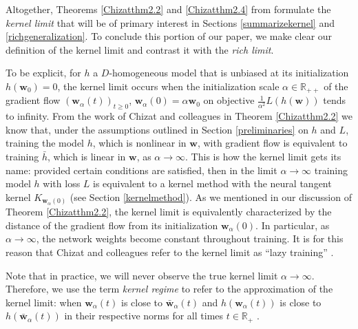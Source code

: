\documentclass{article}
\begin{document}
Altogether, Theorems \ref{Chizatthm2.2} and \ref{Chizatthm2.4} from \cite{chizat2019lazy} formulate the \textit{kernel limit} that will be of primary interest in Sections \ref{summarizekernel} and \ref{richgeneralization}. To conclude this portion of our paper, we make clear our definition of the kernel limit and contrast it with the \textit{rich limit}. 

To be explicit, for $h$ a $D$-homogeneous model that is unbiased at its initialization $h(\boldsymbol{w}_0) = 0$, the kernel limit occurs when the initialization scale $\alpha \in \mathbb{R}_{++}$ of the gradient flow $(\boldsymbol{w}_{\alpha}(t))_{t \geq 0}$, $\boldsymbol{w}_{\alpha}(0) = \alpha \boldsymbol{w}_0$ on objective $\frac{1}{\alpha^2}L(h(\boldsymbol{w}))$ tends to infinity. From the work of Chizat and colleagues in Theorem \ref{Chizatthm2.2} we know that, under the assumptions outlined in Section \ref{preliminaries} on $h$ and $L$, training the model $h$, which is nonlinear in $\boldsymbol{w}$, with gradient flow is equivalent to training $\bar{h}$, which is linear in $\boldsymbol{w}$, as $\alpha \rightarrow \infty$. This is how the kernel limit gets its name: provided certain conditions are satisfied, then in the limit $\alpha \rightarrow \infty$ training model $h$ with loss $L$ is equivalent to a kernel method with the neural tangent kernel $K_{\boldsymbol{w}_{\alpha}(0)}$ (see Section \ref{kernelmethod}). As we mentioned in our discussion of Theorem \ref{Chizatthm2.2}, the kernel limit is equivalently characterized by the distance of the gradient flow from its initialization $\boldsymbol{w}_{\alpha}(0)$. In particular, as $\alpha \rightarrow \infty$, the network weights become constant throughout training. It is for this reason that Chizat and colleagues refer to the kernel limit as \enquote{lazy training} \cite{chizat2019lazy}. 

Note that in practice, we will never observe the true kernel limit $\alpha \rightarrow \infty$. Therefore, we use the term \textit{kernel regime} to refer to the approximation of the kernel limit: when $\boldsymbol{w}_{\alpha}(t)$ is close to $\boldsymbol{\bar{w}}_{\alpha}(t)$ and $h(\boldsymbol{w}_{\alpha}(t))$ is close to $h(\boldsymbol{\bar{w}}_{\alpha}(t))$ in their respective norms for all times $t \in \mathbb{R}_+$ \cite{woodworth2020kernel}.
\end{document}
